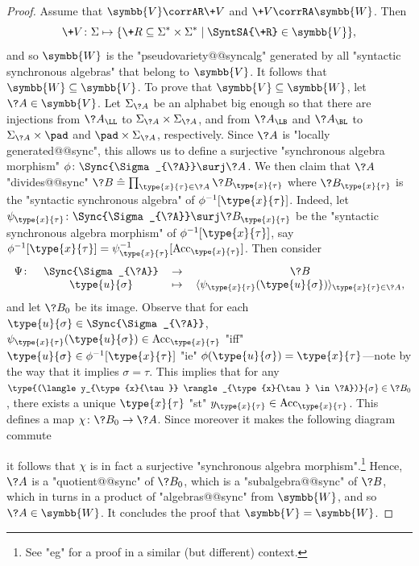 \begin{proof}
	 Assume that $\symbb{V} \corrAR \+V$ and $\+V \corrRA \symbb{W}$.
	Then
	\[\+V\colon \Sigma \mapsto \{\+R \subseteq \Sigma^*\times \Sigma^* \mid \SyntSA{\+R} \in \symbb{V}\},\]
	and so $\symbb{W}$ is the "pseudovariety@@syncalg" generated by all "syntactic synchronous algebras" that 
	belong to $\symbb{V}$.
	It follows that $\symbb{W} \subseteq \symbb{V}$.
	To prove that $\symbb{V} \subseteq \symbb{W}$, let $\?A \in \symbb{V}$.
	Let $\Sigma_{\?A}$ be an alphabet big enough so that
	there are injections from $\?A_{\LL}$ to $\Sigma_{\?A}\times \Sigma_{\?A}$,
	and from $\?A_{\LB}$ and $\?A_{\BL}$ to $\Sigma_{\?A} \times \pad$ and $\pad \times \Sigma_{\?A}$,
	respectively. Since $\?A$ is "locally generated@@sync",
	this allows us to define a surjective "synchronous algebra morphism"
	$\phi\colon \Sync{\Sigma_{\?A}} \surj \?A$.
	We then claim that $\?A$ "divides@@sync"
	$\?B \defeq \prod_{\type{x}{\tau} \in \?A} \?B_{\type{x}{\tau}}$
	where $\?B_{\type{x}{\tau}}$ is the "syntactic synchronous algebra"
	of $\phi^{-1}[\type{x}{\tau}]$.
	Indeed, let $\psi_{\type{x}{\tau}} \colon \Sync{\Sigma_{\?A}} \surj \?B_{\type{x}{\tau}}$
	be the "syntactic synchronous algebra morphism" of $\phi^{-1}[\type{x}{\tau}]$, say
	$\phi^{-1}[\type{x}{\tau}] = \psi_{\type{x}{\tau}}^{-1}[\Acc_{\type{x}{\tau}}]$.
	Then consider
	\[\begin{tabular}{rccc}
		$\Psi\colon$ & $\Sync{\Sigma_{\?A}}$ & $\to$ & $\?B$ \\
		& $\type{u}{\sigma}$ & $\mapsto$ &
			$\langle \psi_{\type{x}{\tau}}(\type{u}{\sigma}) \rangle_{\type{x}{\tau} \in \?A}$,
	\end{tabular}\]
	and let $\?B_0$ be its image. Observe that for each $\type{u}{\sigma} \in \Sync{\Sigma_{\?A}}$,
	$\psi_{\type{x}{\tau}}(\type{u}{\sigma}) \in \Acc_{\type{x}{\tau}}$ "iff"
	$\type{u}{\sigma} \in \phi^{-1}[\type{x}{\tau}]$ "ie" $\phi(\type{u}{\sigma}) = \type{x}{\tau}$---note by the way that it implies $\sigma = \tau$.
	This implies that for any $\type{(\langle y_{\type{x}{\tau}} \rangle_{\type{x}{\tau} \in \?A})}{\sigma} \in \?B_0$, there exists a unique $\type{x}{\tau}$ "st"
	$y_{\type{x}{\tau}} \in \Acc_{\type{x}{\tau}}$. This defines a map
	$\chi\colon \?B_0 \to \?A$. Since moreover it makes the following diagram commute
	
	\begin{center}\end{center}
	it follows that $\chi$ is in fact a surjective "synchronous algebra morphism".\footnote{See "eg" \cite[Lemma 3.2, p.~10]{Bojanczyk2015Recognisable} for a proof in a similar (but different) context.} Hence, $\?A$ is a "quotient@@sync" of $\?B_0$, which is a "subalgebra@@sync" of
	$\?B$, which in turns in a product of "algebras@@sync" from $\symbb{W}$, and so $\?A \in \symbb{W}$.
	It concludes the proof that $\symbb{V} = \symbb{W}$.


\end{proof}
